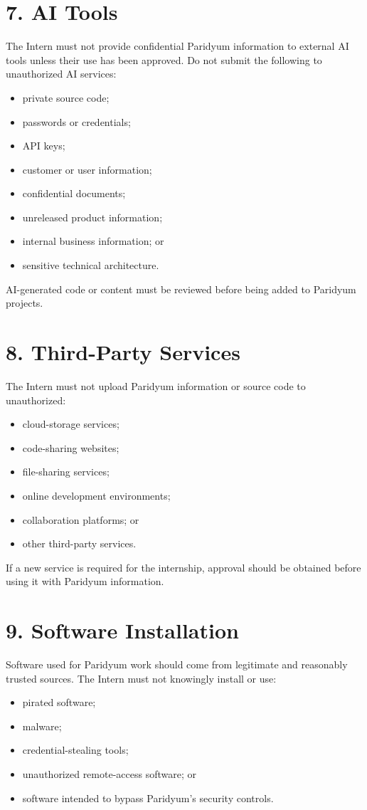 \documentclass{paridyum}
\begin{document}
\section*{7. AI Tools}
The Intern must not provide confidential Paridyum information to external AI tools
unless their use has been approved. Do not submit the following to unauthorized AI
services:
\begin{itemize}[leftmargin=*, noitemsep]
    \item private source code;
    \item passwords or credentials;
    \item API keys;
    \item customer or user information;
    \item confidential documents;
    \item unreleased product information;
    \item internal business information; or
    \item sensitive technical architecture.
\end{itemize}
AI-generated code or content must be reviewed before being added to Paridyum projects.

\section*{8. Third-Party Services}
The Intern must not upload Paridyum information or source code to unauthorized:
\begin{itemize}[leftmargin=*, noitemsep]
    \item cloud-storage services;
    \item code-sharing websites;
    \item file-sharing services;
    \item online development environments;
    \item collaboration platforms; or
    \item other third-party services.
\end{itemize}
If a new service is required for the internship, approval should be obtained before
using it with Paridyum information.

\section*{9. Software Installation}
Software used for Paridyum work should come from legitimate and reasonably trusted
sources. The Intern must not knowingly install or use:
\begin{itemize}[leftmargin=*, noitemsep]
    \item pirated software;
    \item malware;
    \item credential-stealing tools;
    \item unauthorized remote-access software; or
    \item software intended to bypass Paridyum's security controls.
\end{itemize}
\end{document}
